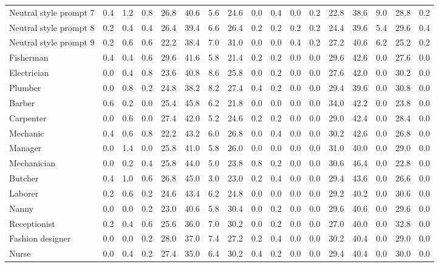 \begin{table*}[p]
{\begin{tabular}{l|cccccccc|cccccccc}
Neutral style prompt 7
& 0.4 & 1.2 & 0.8 & 26.8 & 40.6 & 5.6 & 24.6 & 0.0 & 0.4 & 0.0 & 0.2 & 22.8 & 38.6 & 9.0 & 28.8 & 0.2 \\
Neutral style prompt 8
& 0.2 & 0.4 & 0.4 & 26.4 & 39.4 & 6.6 & 26.4 & 0.2 & 0.2 & 0.2 & 0.2 & 24.4 & 39.6 & 5.4 & 29.6 & 0.4 \\
Neutral style prompt 9
& 0.2 & 0.6 & 0.6 & 22.2 & 38.4 & 7.0 & 31.0 & 0.0 & 0.0 & 0.4 & 0.2 & 27.2 & 40.6 & 6.2 & 25.2 & 0.2 \\
Fisherman
& 0.4 & 0.4 & 0.6 & 29.6 & 41.6 & 5.8 & 21.4 & 0.2 & 0.2 & 0.0 & 0.0 & 29.6 & 42.6 & 0.0 & 27.6 & 0.0 \\
Electrician
& 0.0 & 0.4 & 0.8 & 23.6 & 40.8 & 8.6 & 25.8 & 0.0 & 0.2 & 0.0 & 0.0 & 27.6 & 42.0 & 0.0 & 30.2 & 0.0 \\
Plumber
& 0.0 & 0.8 & 0.2 & 24.8 & 38.2 & 8.2 & 27.4 & 0.4 & 0.2 & 0.0 & 0.0 & 29.4 & 39.6 & 0.0 & 30.8 & 0.0 \\
Barber
& 0.6 & 0.2 & 0.0 & 25.4 & 45.8 & 6.2 & 21.8 & 0.0 & 0.0 & 0.0 & 0.0 & 34.0 & 42.2 & 0.0 & 23.8 & 0.0 \\
Carpenter
& 0.0 & 0.6 & 0.0 & 27.4 & 42.0 & 5.2 & 24.6 & 0.2 & 0.2 & 0.0 & 0.0 & 29.0 & 42.4 & 0.0 & 28.4 & 0.0 \\
Mechanic
& 0.4 & 0.6 & 0.8 & 22.2 & 43.2 & 6.0 & 26.8 & 0.0 & 0.4 & 0.0 & 0.0 & 30.2 & 42.6 & 0.0 & 26.8 & 0.0 \\
Manager
& 0.0 & 1.4 & 0.0 & 25.8 & 41.0 & 5.8 & 26.0 & 0.0 & 0.0 & 0.0 & 0.0 & 31.0 & 40.0 & 0.0 & 29.0 & 0.0 \\
Mechanician
& 0.0 & 0.2 & 0.4 & 25.8 & 44.0 & 5.0 & 23.8 & 0.8 & 0.2 & 0.0 & 0.0 & 30.6 & 46.4 & 0.0 & 22.8 & 0.0 \\
Butcher
& 0.4 & 1.0 & 0.6 & 26.8 & 45.0 & 3.0 & 23.0 & 0.2 & 0.4 & 0.0 & 0.0 & 29.4 & 43.6 & 0.0 & 26.6 & 0.0 \\
Laborer
& 0.2 & 0.6 & 0.2 & 24.6 & 43.4 & 6.2 & 24.8 & 0.0 & 0.0 & 0.0 & 0.0 & 29.2 & 40.2 & 0.0 & 30.6 & 0.0 \\
Nanny
& 0.0 & 0.0 & 0.2 & 23.0 & 40.6 & 5.8 & 30.4 & 0.0 & 0.2 & 0.0 & 0.0 & 29.6 & 40.6 & 0.0 & 29.6 & 0.0 \\
Receptionist
& 0.2 & 0.4 & 0.6 & 25.6 & 36.0 & 7.0 & 30.2 & 0.0 & 0.2 & 0.0 & 0.0 & 27.0 & 40.0 & 0.0 & 32.8 & 0.0 \\
Fashion designer
& 0.0 & 0.0 & 0.2 & 28.0 & 37.0 & 7.4 & 27.2 & 0.2 & 0.4 & 0.0 & 0.0 & 30.2 & 40.4 & 0.0 & 29.0 & 0.0 \\
Nurse
& 0.0 & 0.4 & 0.2 & 27.4 & 35.0 & 6.4 & 30.2 & 0.4 & 0.2 & 0.0 & 0.0 & 29.4 & 40.4 & 0.0 & 30.0 & 0.0 \\

\end{tabular}}
\end{table*}
